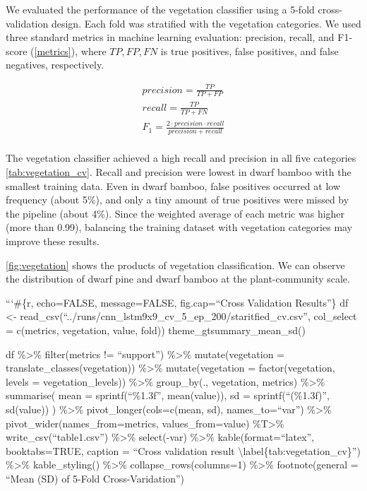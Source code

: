\documentclass{article}
\begin{document}
We evaluated the performance of the vegetation classifier using a 5-fold cross-validation design. Each fold was stratified with the vegetation categories. We used three standard metrics in machine learning evaluation: precision, recall, and F1-score (\ref{metrics}), where \(TP, FP, FN\) is true positives, false positives, and false negatives, respectively.

\label{metrics}
\begin{align}
  precision = \frac{TP}{TP + FP} \\
  recall = \frac{TP}{TP + FN} \\
  F_1 = \frac{2 \cdot precision \cdot recall}{precision + recall} \\
\end{align}

The vegetation classifier achieved a high recall and precision in all five categories \ref{tab:vegetation_cv}. Recall and precision were lowest in dwarf bamboo with the smallest training data. Even in dwarf bamboo, false positives occurred at low frequency (about 5\%), and only a tiny amount of true positives were missed by the pipeline (about 4\%). Since the weighted average of each metric was higher (more than 0.99), balancing the training dataset with vegetation categories may improve these results.

\ref{fig:vegetation} shows the products of vegetation classification. We can observe the distribution of dwarf pine and dwarf bamboo at the plant-community scale.

```\#\{r, echo=FALSE, message=FALSE, fig.cap=``Cross Validation Results''\}
df \textless- read\_csv(``../runs/cnn\_lstm9x9\_cv\_5\_ep\_200/staritfied\_cv.csv'',
col\_select = c(metrics, vegetation, value, fold))
theme\_gtsummary\_mean\_sd()

df \%\textgreater\%
filter(metrics != ``support'') \%\textgreater\%
mutate(vegetation = translate\_classes(vegetation)) \%\textgreater\%
mutate(vegetation = factor(vegetation, levels = vegetation\_levels)) \%\textgreater\%
group\_by(., vegetation, metrics) \%\textgreater\%
summarise(
mean = sprintf(``\%1.3f'', mean(value)),
sd = sprintf(``(\%1.3f)'', sd(value))
) \%\textgreater\%
pivot\_longer(cols=c(mean, sd), names\_to=``var'') \%\textgreater\%
pivot\_wider(names\_from=metrics, values\_from=value) \%T\textgreater\%
write\_csv(``table1.csv'') \%\textgreater\%
select(-var) \%\textgreater\%
kable(format=``latex'', booktabs=TRUE, caption = ``Cross validation result \textbackslash label\{tab:vegetation\_cv\}'') \%\textgreater\%
kable\_styling() \%\textgreater\%
collapse\_rows(columns=1) \%\textgreater\%
footnote(general = ``Mean (SD) of 5-Fold Cross-Varidation'')
\end{document}
